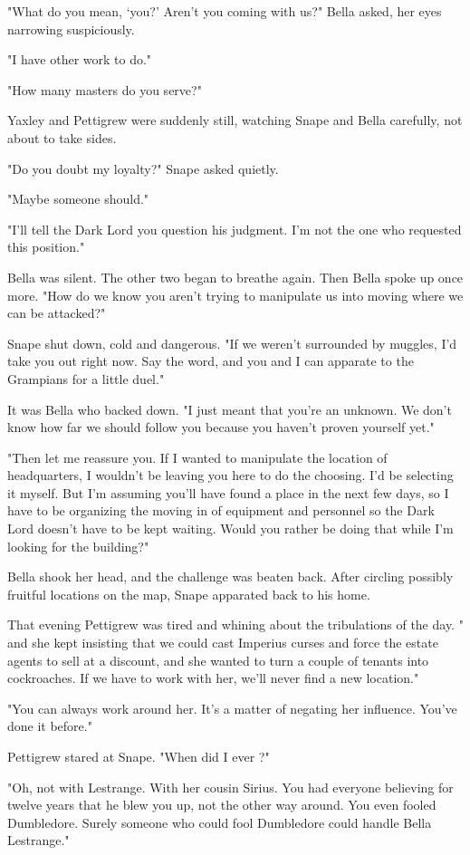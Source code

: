 "What do you mean, `you?' Aren't you coming with us?" Bella asked, her eyes narrowing suspiciously.

"I have other work to do."

"How many masters do you serve?"

Yaxley and Pettigrew were suddenly still, watching Snape and Bella carefully, not about to take sides.

"Do you doubt my loyalty?" Snape asked quietly.

"Maybe someone should."

"I'll tell the Dark Lord you question his judgment. I'm not the one who requested this position."

Bella was silent. The other two began to breathe again. Then Bella spoke up once more. "How do we know you aren't trying to manipulate us into moving where we can be attacked?"

Snape shut down, cold and dangerous. "If we weren't surrounded by muggles, I'd take you out right now. Say the word, and you and I can apparate to the Grampians for a little duel."

It was Bella who backed down. "I just meant that you're an unknown. We don't know how far we should follow you because you haven't proven yourself yet."

"Then let me reassure you. If I wanted to manipulate the location of headquarters, I wouldn't be leaving you here to do the choosing. I'd be selecting it myself. But I'm assuming you'll have found a place in the next few days, so I have to be organizing the moving in of equipment and personnel so the Dark Lord doesn't have to be kept waiting. Would you rather be doing that while I'm looking for the building?"

Bella shook her head, and the challenge was beaten back. After circling possibly fruitful locations on the map, Snape apparated back to his home.

That evening Pettigrew was tired and whining about the tribulations of the day. "{\el} and she kept insisting that we could cast Imperius curses and force the estate agents to sell at a discount, and she wanted to turn a couple of tenants into cockroaches. If we have to work with her, we'll never find a new location."

"You can always work around her. It's a matter of negating her influence. You've done it before."

Pettigrew stared at Snape. "When did I ever{\el} ?"

"Oh, not with Lestrange. With her cousin Sirius. You had everyone believing for twelve years that he blew you up, not the other way around. You even fooled Dumbledore. Surely someone who could fool Dumbledore could handle Bella Lestrange."

